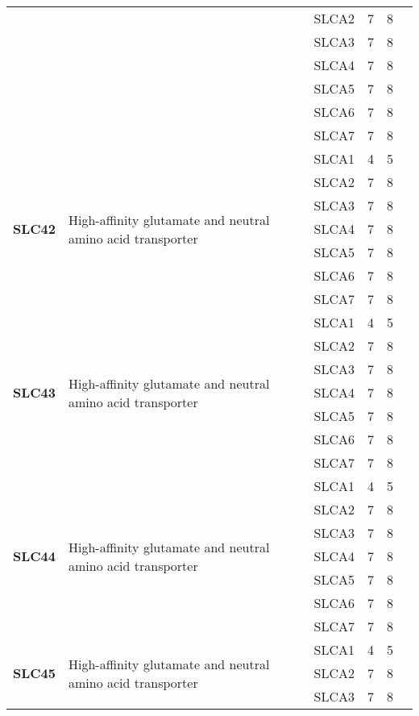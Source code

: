 \documentclass[12pt]{report}
\begin{document}
\begin{center}
\begin{longtable}{|p{1.5cm}|p{3.2cm}|p{1.9cm}|p{1.65cm}|p{3cm}|p{3cm}|}
\cline{3-6}
&&SLCA2&7 & 8&\\ 
\cline{3-6}
&&SLCA3&7 & 8&\\ 
\cline{3-6}
&&SLCA4&7 & 8&\\ 
\cline{3-6}
&&SLCA5&7 & 8&\\ 
\cline{3-6}
&&SLCA6&7 & 8&\\ 
\cline{3-6}
&&SLCA7&7 & 8&\\ 
\hline
\multirow{7}{1.5cm}{\textbf{SLC42}} & \multirow{7}{4cm}{High-affinity glutamate and neutral amino acid transporter} & SLCA1 & 4 & 5\\ 
\cline{3-6}
&&SLCA2&7 & 8&\\ 
\cline{3-6}
&&SLCA3&7 & 8&\\ 
\cline{3-6}
&&SLCA4&7 & 8&\\ 
\cline{3-6}
&&SLCA5&7 & 8&\\ 
\cline{3-6}
&&SLCA6&7 & 8&\\ 
\cline{3-6}
&&SLCA7&7 & 8&\\ 
\hline
\multirow{7}{1.5cm}{\textbf{SLC43}} & \multirow{7}{4cm}{High-affinity glutamate and neutral amino acid transporter} & SLCA1 & 4 & 5\\ 
\cline{3-6}
&&SLCA2&7 & 8&\\ 
\cline{3-6}
&&SLCA3&7 & 8&\\ 
\cline{3-6}
&&SLCA4&7 & 8&\\ 
\cline{3-6}
&&SLCA5&7 & 8&\\ 
\cline{3-6}
&&SLCA6&7 & 8&\\ 
\cline{3-6}
&&SLCA7&7 & 8&\\ 
\hline
\multirow{7}{1.5cm}{\textbf{SLC44}} & \multirow{7}{4cm}{High-affinity glutamate and neutral amino acid transporter} & SLCA1 & 4 & 5\\ 
\cline{3-6}
&&SLCA2&7 & 8&\\ 
\cline{3-6}
&&SLCA3&7 & 8&\\ 
\cline{3-6}
&&SLCA4&7 & 8&\\ 
\cline{3-6}
&&SLCA5&7 & 8&\\ 
\cline{3-6}
&&SLCA6&7 & 8&\\ 
\cline{3-6}
&&SLCA7&7 & 8&\\ 
\hline
\multirow{7}{1.5cm}{\textbf{SLC45}} & \multirow{7}{4cm}{High-affinity glutamate and neutral amino acid transporter} & SLCA1 & 4 & 5\\ 
\cline{3-6}
&&SLCA2&7 & 8&\\ 
\cline{3-6}
&&SLCA3&7 & 8&\\ 

\end{longtable}
\end{center}
\end{document}
